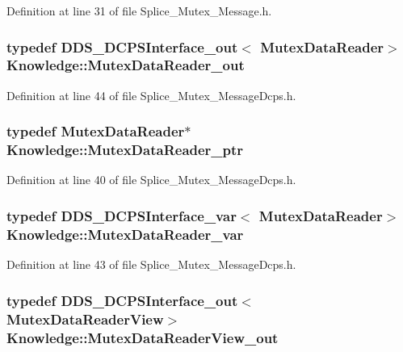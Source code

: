 Definition at line 31 of file Splice\_\-Mutex\_\-Message.h.

\hypertarget{namespaceKnowledge_a2ba100a804da335033f0d8b30f5d2df9}{
\subsubsection[{MutexDataReader\_\-out}]{\setlength{\rightskip}{0pt plus 5cm}typedef DDS\_\-DCPSInterface\_\-out$<$ {\bf MutexDataReader}$>$ {\bf Knowledge::MutexDataReader\_\-out}}}
\label{da/d50/namespaceKnowledge_a2ba100a804da335033f0d8b30f5d2df9}


Definition at line 44 of file Splice\_\-Mutex\_\-MessageDcps.h.

\hypertarget{namespaceKnowledge_adb998b7a1d6009cbfe917e56113f10b8}{
\subsubsection[{MutexDataReader\_\-ptr}]{\setlength{\rightskip}{0pt plus 5cm}typedef {\bf MutexDataReader}$\ast$ {\bf Knowledge::MutexDataReader\_\-ptr}}}
\label{da/d50/namespaceKnowledge_adb998b7a1d6009cbfe917e56113f10b8}


Definition at line 40 of file Splice\_\-Mutex\_\-MessageDcps.h.

\hypertarget{namespaceKnowledge_a1af3d1f19c7cf91384b3fb2a37b3258b}{
\subsubsection[{MutexDataReader\_\-var}]{\setlength{\rightskip}{0pt plus 5cm}typedef DDS\_\-DCPSInterface\_\-var$<$ {\bf MutexDataReader}$>$ {\bf Knowledge::MutexDataReader\_\-var}}}
\label{da/d50/namespaceKnowledge_a1af3d1f19c7cf91384b3fb2a37b3258b}


Definition at line 43 of file Splice\_\-Mutex\_\-MessageDcps.h.

\hypertarget{namespaceKnowledge_a4390ee0ebae0085c32130a6f894d1cee}{
\subsubsection[{MutexDataReaderView\_\-out}]{\setlength{\rightskip}{0pt plus 5cm}typedef DDS\_\-DCPSInterface\_\-out$<$ {\bf MutexDataReaderView}$>$ {\bf Knowledge::MutexDataReaderView\_\-out}}}
\label{da/d50/namespaceKnowledge_a4390ee0ebae0085c32130a6f894d1cee}


